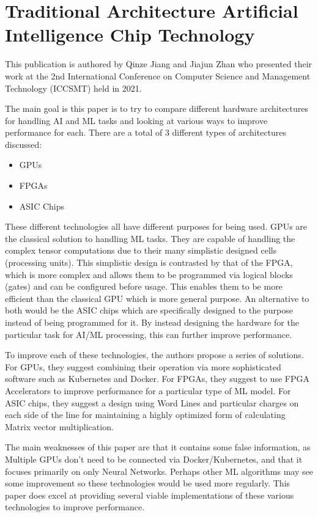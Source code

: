 \section{Traditional Architecture Artificial Intelligence Chip Technology}\label{sec:paper1}

This publication is authored by Qinze Jiang and Jiajun Zhan who presented their work at the 2nd International Conference on Computer Science and Management Technology (ICCSMT) held in 2021.

The main goal is this paper is to try to compare different hardware architectures for handling AI and ML tasks and looking at various ways to improve performance for each.
There are a total of 3 different types of architectures discussed:
\begin{itemize}
    \item GPUs
    \item FPGAs
    \item ASIC Chips
\end{itemize}

These different technologies all have different purposes for being used.
GPUs are the classical solution to handling ML tasks.
They are capable of handling the complex tensor computations due to their many simplistic designed cells (processing units).
This simplistic design is contrasted by that of the FPGA, which is more complex and allows them to be programmed via logical blocks (gates) and can be configured before usage.
This enables them to be more efficient than the classical GPU which is more general purpose.
An alternative to both would be the ASIC chips which are specifically designed to the purpose instead of being programmed for it.
By instead designing the hardware for the particular task for AI/ML processing, this can further improve performance.

To improve each of these technologies, the authors propose a series of solutions.
For GPUs, they suggest combining their operation via more sophisticated software such as Kubernetes and Docker.
For FPGAs, they suggest to use FPGA Accelerators to improve performance for a particular type of ML model.
For ASIC chips, they suggest a design using Word Lines and particular charges on each side of the line for maintaining a highly optimized form of calculating Matrix vector multiplication.

The main weaknesses of this paper are that it contains some false information, as Multiple GPUs don't need to be connected via Docker/Kubernetes, and that it focuses primarily on only Neural Networks.
Perhaps other ML algorithms may see some improvement so these technologies would be used more regularly.
This paper does excel at providing several viable implementations of these various technologies to improve performance.